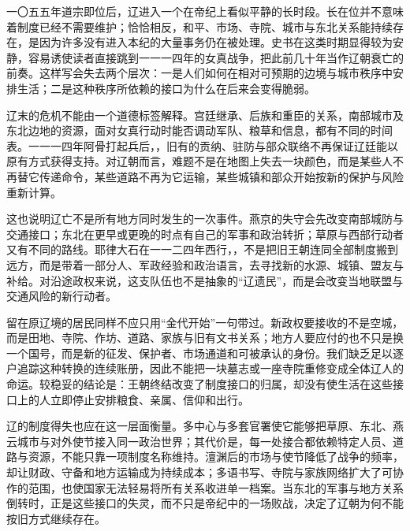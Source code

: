 一〇五五年道宗即位后，辽进入一个在帝纪上看似平静的长时段。长在位并不意味着制度已经不需要维护；恰恰相反，和平、市场、寺院、城市与东北关系能持续存在，是因为许多没有进入本纪的大量事务仍在被处理。史书在这类时期显得较为安静，容易诱使读者直接跳到一一一四年的女真战争，把此前几十年当作辽朝衰亡的前奏。这样写会失去两个层次：一是人们如何在相对可预期的边境与城市秩序中安排生活；二是这种秩序所依赖的接口为什么在后来会变得脆弱。

辽末的危机不能由一个道德标签解释。宫廷继承、后族和重臣的关系，南部城市及东北边地的资源，面对女真行动时能否调动军队、粮草和信息，都有不同的时间表。一一一四年阿骨打起兵后，，旧有的贡纳、驻防与部众联络不再保证辽廷能以原有方式获得支持。对辽朝而言，难题不是在地图上失去一块颜色，而是某些人不再替它传递命令，某些道路不再为它运输，某些城镇和部众开始按新的保护与风险重新计算。

这也说明辽亡不是所有地方同时发生的一次事件。燕京的失守会先改变南部城防与交通接口；东北在更早或更晚的时点有自己的军事和政治转折；草原与西部行动者又有不同的路线。耶律大石在一一二四年西行，，不是把旧王朝连同全部制度搬到远方，而是带着一部分人、军政经验和政治语言，去寻找新的水源、城镇、盟友与补给。对沿途政权来说，这支队伍也不是抽象的“辽遗民”，而是会改变当地联盟与交通风险的新行动者。

留在原辽境的居民同样不应只用“金代开始”一句带过。新政权要接收的不是空城，而是田地、寺院、作坊、道路、家族与旧有文书关系；地方人要应付的也不只是换一个国号，而是新的征发、保护者、市场通道和可被承认的身份。我们缺乏足以逐户追踪这种转换的连续账册，因此不能把一块墓志或一座寺院重修变成全体辽人的命运。较稳妥的结论是：王朝终结改变了制度接口的归属，却没有使生活在这些接口上的人立即停止安排粮食、亲属、信仰和出行。

辽的制度得失也应在这一层面衡量。多中心与多套官署使它能够把草原、东北、燕云城市与对外使节接入同一政治世界；其代价是，每一处接合都依赖特定人员、道路与资源，不能只靠一项制度名称维持。澶渊后的市场与使节降低了战争的频率，却让财政、守备和地方运输成为持续成本；多语书写、寺院与家族网络扩大了可协作的范围，也使国家无法轻易将所有关系收进单一档案。当东北的军事与地方关系倒转时，正是这些接口的失灵，而不只是帝纪中的一场败战，决定了辽朝为何不能按旧方式继续存在。
